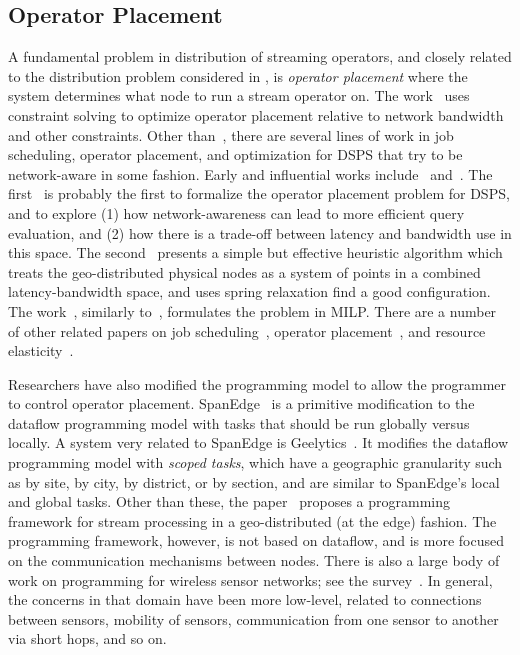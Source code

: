 \subsection{Operator Placement}

A fundamental problem in distribution of streaming operators, and closely related to the distribution problem considered in ,
is \emph{operator placement} where the system determines what node to run a stream operator on.
The work~\cite{cardellini2016optimal} uses constraint solving to optimize operator placement relative to network bandwidth and other constraints.
Other than~\cite{cardellini2016optimal}, there are several lines of work in job scheduling, operator placement, and optimization for DSPS that try to be network-aware in some fashion. Early and influential works include~\cite{ahmad2004network} and~\cite{pietzuch2006network}.
The first~\cite{ahmad2004network} is probably the first to formalize the operator placement problem for DSPS, and to explore (1) how network-awareness can lead to more efficient query evaluation, and (2) how there is a trade-off between latency and bandwidth use in this space.
The second~\cite{pietzuch2006network} presents a simple but effective heuristic algorithm which treats the geo-distributed physical nodes as a system of points in a combined latency-bandwidth space, and uses spring relaxation find a good configuration.
The work~\cite{gu2015general}, similarly to~\cite{cardellini2016optimal}, formulates the problem in MILP.
There are a number of other related papers on job scheduling~\cite{aniello2013adaptive,xu2014tstorm,eidenbenz2016task,wolf2008soda,fu2019edgewise}, operator placement~\cite{bonfils2004adaptive,tziritas2016improving,rizou2010solving,lakshmanan2008placement},
and resource elasticity~\cite{cardellini2018decentralized,hochreiner2016elastic,cardellini2018optimal,dias2018dsp-survey}.

Researchers have also modified the programming model to allow the programmer to control operator placement.
SpanEdge~\cite{sajjad2016spanedge} is a primitive modification to the dataflow programming model with tasks that should be run globally versus locally.
A system very related to SpanEdge is Geelytics~\cite{cheng2015geelytics}.
It modifies the dataflow programming model with \emph{scoped tasks}, which have a geographic granularity such as by site, by city, by district, or by section, and are similar to SpanEdge's local and global tasks.
Other than these, the paper~\cite{renart2017datadrivenstreamedge} proposes a programming framework for stream processing in a geo-distributed (at the edge) fashion. The programming framework, however, is not based on dataflow, and is more focused on the communication mechanisms between nodes. There is also a large body of work on programming for wireless sensor networks; see the survey~\cite{mottola2011programming-wsn}. In general, the concerns in that domain have been more low-level, related to connections between sensors, mobility of sensors, communication from one sensor to another via short hops, and so on.

